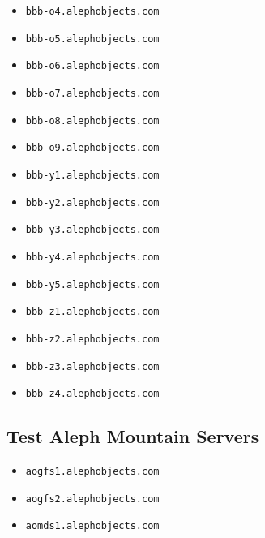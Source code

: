 \begin{itemize}
\item \texttt{bbb-o4.alephobjects.com}
\item \texttt{bbb-o5.alephobjects.com}
\item \texttt{bbb-o6.alephobjects.com}
\item \texttt{bbb-o7.alephobjects.com}
\item \texttt{bbb-o8.alephobjects.com}
\item \texttt{bbb-o9.alephobjects.com}
\item \texttt{bbb-y1.alephobjects.com}
\item \texttt{bbb-y2.alephobjects.com}
\item \texttt{bbb-y3.alephobjects.com}
\item \texttt{bbb-y4.alephobjects.com}
\item \texttt{bbb-y5.alephobjects.com}
\item \texttt{bbb-z1.alephobjects.com}
\item \texttt{bbb-z2.alephobjects.com}
\item \texttt{bbb-z3.alephobjects.com}
\item \texttt{bbb-z4.alephobjects.com}
\end{itemize}

\subsection{Test Aleph Mountain Servers}
\begin{itemize}
\item \texttt{aogfs1.alephobjects.com}
\item \texttt{aogfs2.alephobjects.com}
\item \texttt{aomds1.alephobjects.com}
\end{itemize}

